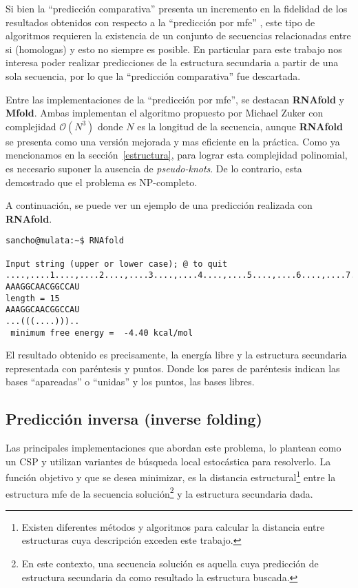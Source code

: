 Si bien la ``predicci\'on comparativa'' presenta un incremento en la fidelidad
de los resultados obtenidos con respecto a la ``predicci\'on por \ac{mfe}''
\cite{Gardner04}, este tipo de algoritmos requieren la existencia de un conjunto
de secuencias relacionadas entre si (homologas) y esto no siempre es posible. En
particular para este trabajo nos interesa poder realizar predicciones de la
estructura secundaria a partir de una sola secuencia, por lo que la
``predicci\'on comparativa'' fue descartada.

Entre las implementaciones de la ``predicci\'on por \ac{mfe}'', se destacan
\textbf{RNAfold}\cite{Hofacker94} y \textbf{Mfold}\cite{Zuker81}. Ambas
implementan el algoritmo propuesto por Michael Zuker con complejidad
$\mathcal{O}(N^{3})$ donde $N$ es la longitud de la secuencia, aunque
\textbf{RNAfold} se presenta como una versi\'on mejorada y mas eficiente en la
pr\'actica. Como ya mencionamos en la secci\'on~\ref{estructura}, para lograr
esta complejidad polinomial, es necesario suponer la ausencia de
\textit{pseudo-knots}. De lo contrario, esta demostrado que el problema es
NP-completo\cite{Lyngso00}.

A continuaci\'on, se puede ver un ejemplo de una predicci\'on realizada con
\textbf{RNAfold}.

\begin{verbatim}
sancho@mulata:~$ RNAfold

Input string (upper or lower case); @ to quit
....,....1....,....2....,....3....,....4....,....5....,....6....,....7....,....8
AAAGGCAACGGCCAU
length = 15
AAAGGCAACGGCCAU
...(((....)))..
 minimum free energy =  -4.40 kcal/mol
\end{verbatim}

El resultado obtenido es precisamente, la energ\'ia libre y la estructura
secundaria representada con par\'entesis y puntos. Donde los pares de
par\'entesis indican las bases ``apareadas'' o ``unidas'' y los puntos, las
bases libres.

\subsection{Predicci\'on inversa (inverse folding)}
\label{inverse}
Las principales implementaciones que abordan este problema, lo plantean como un
\ac{CSP} y utilizan variantes de b\'usqueda local estoc\'astica para
resolverlo. La funci\'on objetivo y que se desea minimizar, es la distancia
estructural\footnote{Existen diferentes m\'etodos y algoritmos para calcular
la distancia entre estructuras cuya descripci\'on exceden este trabajo.}
entre la estructura \ac{mfe} de la secuencia soluci\'on\footnote{En este
contexto, una secuencia soluci\'on es aquella cuya predicci\'on de estructura
secundaria da como resultado la estructura buscada.} y la estructura secundaria
dada. 

